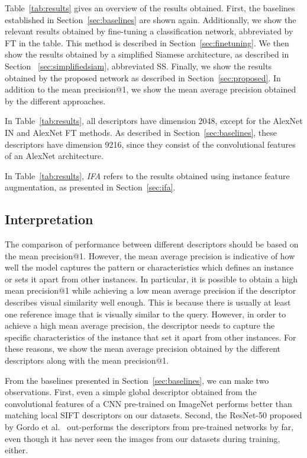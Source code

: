 Table~\ref{tab:results} gives an overview of the results obtained. First,
the baselines established in Section~\ref{sec:baselines} are shown
again. Additionally, we show the relevant results obtained by fine-tuning
a classification network, abbreviated by FT in the table. This method
is described in Section~\ref{sec:finetuning}. We then show the results
obtained by a simplified Siamese architecture, as described in Section
~\ref{sec:simplifiedsiam}, abbreviated SS. Finally, we show the results
obtained by the proposed network as described in Section~\ref{sec:proposed}.
In addition to the mean precision@1, we show the mean average
precision obtained by the different approaches.

In Table~\ref{tab:results}, all descriptors have dimension 2048, except
for the AlexNet IN and AlexNet FT methods. As described in
Section~\ref{sec:baselines}, these descriptors have dimension 9216,
since they consist of the convolutional features of an
AlexNet architecture.

In Table~\ref{tab:results}, \emph{IFA} refers to the results obtained
using instance feature augmentation, as presented in Section~\ref{sec:ifa}.

\subsection{Interpretation}
The comparison of performance between different descriptors should
be based on the mean precision@1. However, the mean average
precision is indicative of how well the model
captures the pattern or characteristics which defines an instance or
sets it apart from other instances. In particular, it is possible to obtain
a high mean precision@1 while achieving a low mean average precision
if the descriptor describes visual similarity well enough. This is because
there is usually at least one reference image that is visually similar
to the query. However, in order to achieve a high mean average precision,
the descriptor needs to capture the specific characteristics of the
instance that set it apart from other instances. For these reasons,
we show the mean average precision obtained by the different
descriptors along with the mean precision@1.

From the baselines presented in Section~\ref{sec:baselines}, we can make
two observations. First, even a simple global descriptor obtained from the
convolutional features of a CNN pre-trained on ImageNet performs better
than matching local SIFT descriptors on our datasets. Second, the ResNet-50
proposed by Gordo et al.~\cite{gordo_deep_2016} out-performs the descriptors
from pre-trained networks by far, even though it has never seen the images
from our datasets during training, either.


